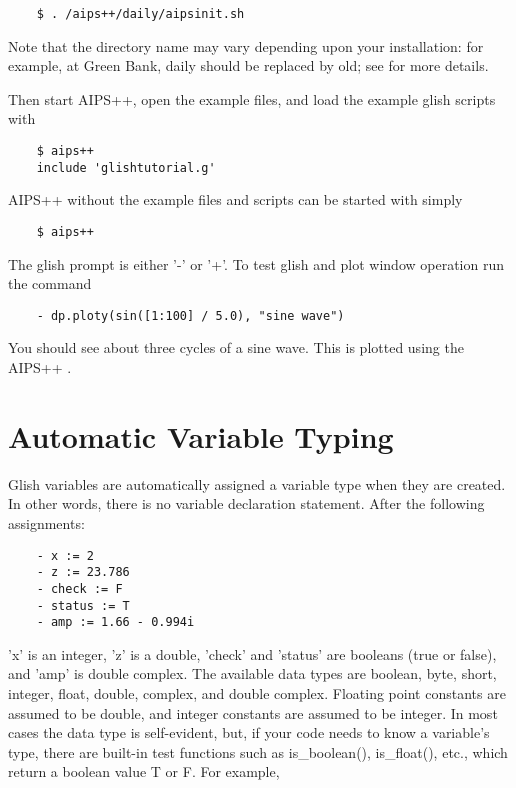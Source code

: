 \begin{verbatim}
	$ . /aips++/daily/aipsinit.sh
\end{verbatim}

Note that the directory name may vary depending upon your
installation: for example, at Green Bank, daily should be replaced by
old; see  for more details.

Then start AIPS++, open the example files, and load the example glish
scripts with

\begin{verbatim}
	$ aips++
	include 'glishtutorial.g'
\end{verbatim}

AIPS++ without the example files and scripts can be started with simply

\begin{verbatim}
	$ aips++
\end{verbatim}

The glish prompt is either '-' or '+'.  To test glish and plot window
operation run the command

\begin{verbatim}
	- dp.ploty(sin([1:100] / 5.0), "sine wave")
\end{verbatim}

You should see about three cycles of a sine wave. This is plotted
using the AIPS++ .

\section{Automatic Variable Typing}

    Glish variables are automatically assigned a variable type when they
are created.  In other words, there is no variable declaration statement.
After the following assignments:

\begin{verbatim}
	- x := 2
	- z := 23.786
	- check := F
	- status := T
	- amp := 1.66 - 0.994i
\end{verbatim}

'x' is an integer, 'z' is a double, 'check' and 'status' are booleans (true
or false), and 'amp' is double complex.  The available data types are
boolean, byte, short, integer, float, double, complex, and double complex.
Floating point constants are assumed to be double, and integer constants
are assumed to be integer.  In most cases the data type is self-evident,
but, if your code needs to know a variable's type, there are built-in test
functions such as is\_boolean(), is\_float(), etc., which return a boolean
value T or F.  For example,

